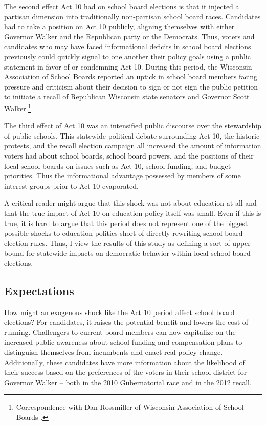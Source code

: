 The second effect Act 10 had on school board elections is that it injected a 
partisan dimension into traditionally non-partisan school board races. Candidates 
had to take a position on Act 10 publicly, aligning themselves 
with either Governor Walker and the Republican party or the 
Democrats. Thus, voters and candidates who may have faced informational 
deficits in school board elections previously could quickly signal 
to one another their policy goals using a public statement in favor of or condemning 
Act 10. During this period, the Wisconsin Association of School Boards reported 
an uptick in school board members facing pressure and criticism about their decision 
to sign or not sign the public petition to initiate a recall of Republican Wisconsin 
state senators and Governor Scott Walker.\footnote{Correspondence with Dan Rossmiller of 
Wisconsin Association of School Boards \citep{wasb1}.}

The third effect of Act 10 was an intensified public discourse over the 
stewardship of public schools. This statewide political debate surrounding
Act 10, the historic protests, and the recall election campaign all 
increased the amount of information voters had about school boards, school board 
powers, and the positions of their local school boards on issues such as Act 10, 
school funding, and budget priorities. Thus the informational advantage possessed 
by members of some interest groups prior to Act 10 evaporated. 

A critical reader might argue that this shock was not about education at all and 
that the true impact of Act 10 on education policy itself was small. Even if this 
is true, it is hard to argue that this period does not represent one of the 
biggest possible shocks to education politics short of directly rewriting 
school board election rules. Thus, I view the results of this study as defining 
a sort of upper bound for statewide impacts on democratic behavior within 
local school board elections.

\subsection{Expectations}

How might an exogenous shock like the Act 10 period affect school board elections? 
For candidates, it raises the potential benefit and lowers the cost of running. 
Challengers to current board members can now capitalize on the 
increased public awareness about school funding and compensation plans to distinguish 
themselves from incumbents and enact real policy change. Additionally, these candidates 
have more information about the likelihood of their success based on the preferences 
of the voters in their school district for Governor Walker -- both in the 2010 
Gubernatorial race and in the 2012 recall. 

